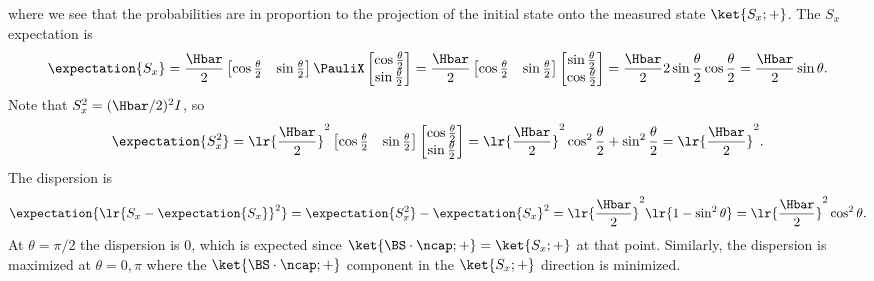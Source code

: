 {where we see that the probabilities are in proportion to the projection of the initial state onto the measured state \( \ket{S_x ; +} \).
%
%
The \( S_x \) expectation is
%
\begin{dmath}\label{eqn:moreBraKetProblems:780}
\expectation{S_x}
=
\frac{\Hbar}{2}
\begin{bmatrix}
\cos\frac{\theta}{2} & \sin\frac{\theta}{2}
\end{bmatrix}
\PauliX
\begin{bmatrix}
\cos\frac{\theta}{2} \\
\sin\frac{\theta}{2}
\end{bmatrix}
=
\frac{\Hbar}{2}
\begin{bmatrix}
\cos\frac{\theta}{2} & \sin\frac{\theta}{2}
\end{bmatrix}
\begin{bmatrix}
\sin\frac{\theta}{2} \\
\cos\frac{\theta}{2}
\end{bmatrix}
=
\frac{\Hbar}{2} 2 \sin\frac{\theta}{2} \cos\frac{\theta}{2}
=
\frac{\Hbar}{2} \sin\theta.
\end{dmath}
%
Note that \( S_x^2 = (\Hbar/2)^2I \), so
%
\begin{dmath}\label{eqn:moreBraKetProblems:800}
\expectation{S_x^2}
=
\lr{\frac{\Hbar}{2}}^2
\begin{bmatrix}
\cos\frac{\theta}{2} & \sin\frac{\theta}{2}
\end{bmatrix}
\begin{bmatrix}
\cos\frac{\theta}{2} \\
\sin\frac{\theta}{2}
\end{bmatrix}
=
\lr{ \frac{\Hbar}{2} }^2
\cos^2\frac{\theta}{2} + \sin^2 \frac{\theta}{2}
=
\lr{ \frac{\Hbar}{2} }^2.
\end{dmath}
%
The dispersion is
%
\begin{dmath}\label{eqn:moreBraKetProblems:820}
\expectation{\lr{ S_x - \expectation{S_x}}^2}
=
\expectation{S_x^2} - \expectation{S_x}^2
=
\lr{ \frac{\Hbar}{2} }^2
\lr{1 - \sin^2 \theta}
=
\lr{ \frac{\Hbar}{2} }^2
\cos^2 \theta.
\end{dmath}
%
At \( \theta = \pi/2 \) the dispersion is 0, which is expected since \( \ket{\BS \cdot \ncap ; + } = \ket{ S_x ; + } \) at that point.  Similarly, the dispersion is maximized at \( \theta = 0,\pi \) where the \( \ket{\BS \cdot \ncap ; + } \) component in the \( \ket{S_x ; + } \) direction is minimized.
%
} %
